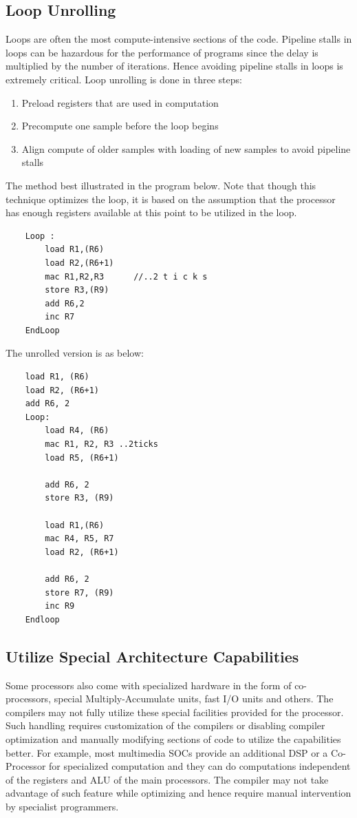 \documentclass[sigconf]{acmart}
\begin{document}
\subsection{Loop Unrolling}
Loops are often the most compute-intensive sections of the code. Pipeline stalls in loops can be hazardous for the performance of programs since the delay is multiplied by the number of iterations. Hence avoiding pipeline stalls in loops is extremely critical. Loop unrolling is done in three steps:
\begin{enumerate}
\item{Preload registers that are used in computation}
\item{Precompute one sample before the loop begins}
\item{Align compute of older samples with loading of new samples to avoid pipeline stalls}
\end{enumerate}
The method best illustrated in the program below. Note that though this technique optimizes the loop, it is based on the assumption that the processor has enough registers available at this point to be utilized in the loop.

\begin{verbatim}
    Loop :
        load R1,(R6)
        load R2,(R6+1)
        mac R1,R2,R3      //..2 t i c k s
        store R3,(R9)
        add R6,2
        inc R7
    EndLoop
\end{verbatim}

The unrolled version is as below:

\begin{verbatim}
    load R1, (R6)
    load R2, (R6+1)
    add R6, 2
    Loop:  
        load R4, (R6)
        mac R1, R2, R3 ..2ticks
        load R5, (R6+1)
    
        add R6, 2
        store R3, (R9)
    
        load R1,(R6)
        mac R4, R5, R7
        load R2, (R6+1)
    
        add R6, 2
        store R7, (R9)
        inc R9
    Endloop
\end{verbatim}


\subsection{Utilize Special Architecture Capabilities}
Some processors also come with specialized hardware in the form of co-processors, special Multiply-Accumulate units, fast I/O units and others. The compilers may not fully utilize these special facilities provided for the processor. Such handling requires customization of the compilers or disabling compiler optimization and manually modifying sections of code to utilize the capabilities better. For example, most multimedia SOCs provide an additional DSP or a Co-Processor for specialized computation and they can do computations independent of the registers and ALU of the main processors. The compiler may not take advantage of such feature while optimizing and hence require manual intervention by specialist programmers.
\end{document}
